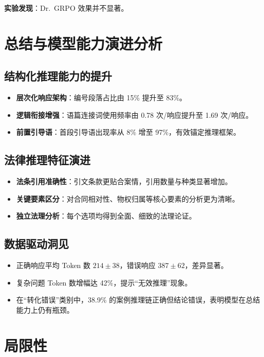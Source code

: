 \documentclass{pkuthesis}
\begin{document}
\noindent\textbf{实验发现}：Dr.\ GRPO 效果并不显著。

\section*{总结与模型能力演进分析}
\label{sec:conclusion}

\subsection*{结构化推理能力的提升}

\begin{itemize}
  \item \textbf{层次化响应架构}：编号段落占比由 15\% 提升至 83\%。
  \item \textbf{逻辑衔接增强}：语篇连接词使用频率由 0.78 次/响应提升至 1.69 次/响应。
  \item \textbf{前置引导语}：首段引导语出现率从 8\% 增至 97\%，有效锚定推理框架。
\end{itemize}

\subsection*{法律推理特征演进}

\begin{itemize}
  \item \textbf{法条引用准确性}：引文条款更贴合案情，引用数量与种类显著增加。
  \item \textbf{关键要素区分}：对合同相对性、物权归属等核心要素的分析更为清晰。
  \item \textbf{独立法理分析}：每个选项均得到全面、细致的法理论证。
\end{itemize}

\subsection*{数据驱动洞见}

\begin{itemize}
  \item 正确响应平均 Token 数 $214\pm38$，错误响应 $387\pm62$，差异显著。
  \item 复杂问题 Token 数增幅达 42\%，提示“无效推理”现象。
  \item 在“转化错误”类别中，38.9\% 的案例推理链正确但结论错误，表明模型在总结能力上仍有瓶颈。
\end{itemize}

\section*{局限性}
\end{document}
